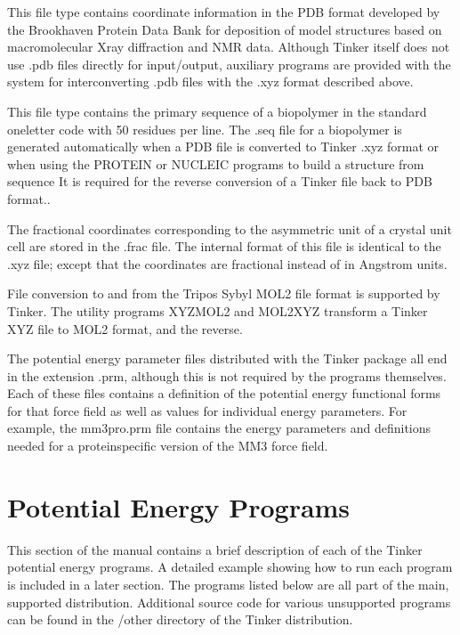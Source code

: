 \documentclass[letterpaper,11pt,english]{sphinxmanual}
\begin{document}

This file type contains coordinate information in the PDB format developed by the Brookhaven Protein Data Bank for deposition of model structures based on macromolecular X\sphinxhyphen{}ray diffraction and NMR data. Although Tinker itself does not use .pdb files directly for input/output, auxiliary programs are provided with the system for interconverting .pdb files with the .xyz format described above.


This file type contains the primary sequence of a biopolymer in the standard one\sphinxhyphen{}letter code with 50 residues per line. The .seq file for a biopolymer is generated automatically when a PDB file is converted to Tinker .xyz format or when using the PROTEIN or NUCLEIC programs to build a structure from sequence It is required for the reverse conversion of a Tinker file back to PDB format..


The fractional coordinates corresponding to the asymmetric unit of a crystal unit cell are stored in the .frac file. The internal format of this file is identical to the .xyz file; except that the coordinates are fractional instead of in Angstrom units.


File conversion to and from the Tripos Sybyl MOL2 file format is supported by Tinker. The utility programs XYZMOL2 and MOL2XYZ transform a Tinker XYZ file to MOL2 format, and the reverse.


The potential energy parameter files distributed with the Tinker package all end in the extension .prm, although this is not required by the programs themselves. Each of these files contains a definition of the potential energy functional forms for that force field as well as values for individual energy parameters. For example, the mm3pro.prm file contains the energy parameters and definitions needed for a protein\sphinxhyphen{}specific version of the MM3 force field.


\chapter{Potential Energy Programs}
\label{\detokenize{text/energy-programs:potential-energy-programs}}\label{\detokenize{text/energy-programs::doc}}
This section of the manual contains a brief description of each of the Tinker potential energy programs. A detailed example showing how to run each program is included in a later section. The programs listed below are all part of the main, supported distribution. Additional source code for various unsupported programs can be found in the /other directory of the Tinker distribution.
\end{document}
